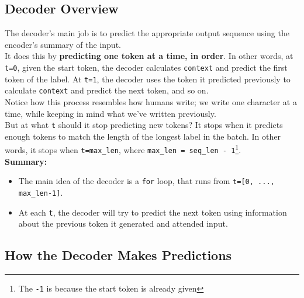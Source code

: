 \documentclass{article}
\newcommand{\ttt}[1]{\texttt{#1}}
\begin{document}




\subsection{Decoder Overview}

The decoder's main job is to predict the appropriate output sequence using the encoder's summary of the input. \\

It does this by \textbf{predicting one token at a time, in order}. In other words, at \ttt{t=0}, given the start token, the decoder calculates \ttt{context} and predict the first token of the label. At \ttt{t=1}, the decoder uses the token it predicted previously to calculate \ttt{context} and  predict the next token, and so on. \\

Notice how this process resembles how humans write; we write one character at a time, while keeping in mind what we've written previously. \\

But at what \ttt{t} should it stop predicting new tokens? It stops when it predicts enough tokens to match the length of the longest label in the batch. In other words, it stops when \ttt{t=max\_len}, where \ttt{max\_len = seq\_len - 1}\footnote{The \ttt{-1} is because the start token is already given}.\\

\textbf{Summary:}

\begin{itemize}
    \item The main idea of the decoder is a \ttt{for} loop, that runs from \ttt{t=[0, ..., max\_len-1]}.
    \item At each \ttt{t}, the decoder will try to predict the next token using information about the previous token it generated and attended input.
\end{itemize}


\subsection{How the Decoder Makes Predictions}
\end{document}
